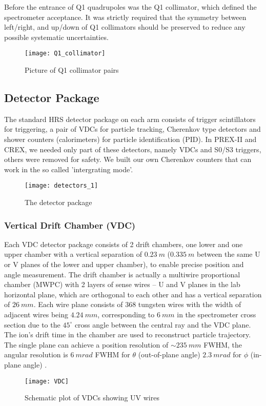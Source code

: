 Before the entrance of Q1 quadrupoles was the Q1 collimator, which defined
the spectrometer acceptance. It was strictly required that the symmetry between
left/right, and up/down of Q1 collimators should be preserved to reduce any
possible systematic uncertainties.
\begin{figure}[h!]
    \centering
    \texttt{[image: Q1\_collimator]}
    \caption{Picture of Q1 collimator pairs}
\end{figure}
\subsection{Detector Package}
The standard HRS detector package on each arm consists of trigger scintillators for
triggering, a pair of VDCs for particle tracking, Cherenkov type detectors and
shower counters (calorimeters) for particle identification (PID). In PREX-II
and CREX, we needed only part of these detectors, namely VDCs and S0/S3 triggers,
others were removed for safety. We built our own Cherenkov counters that can 
work in the so called 'intergrating mode'.
\begin{figure}[h!]
    \centering
    \texttt{[image: detectors\_1]}
    \caption{The detector package}
    \label{fig:detectors}
\end{figure}

\subsubsection{Vertical Drift Chamber (VDC)}
Each VDC detector package consists of 2 drift chambers, one lower and one upper
chamber with a vertical separation of $0.23\ m$ ($0.335\ m$ between the same
U or V planes of the lower and upper chamber), to enable precise position and angle measurement. 
The drift chamber is actually a multiwire proportional chamber (MWPC) with 2 
layers of sense wires -- U and V planes in the lab horizontal plane, which are 
orthogonal to each other and has a vertical separation of $26\ mm$. 
Each wire plane consists of 368 tungsten wires with the width of adjacent wires 
being $4.24\ mm$, corresponding to $6\ mm$ in the spectrometer cross section due to the $45^\circ$
cross angle between the central ray and the VDC plane. The ion's drift time in 
the chamber are used to reconstruct particle trajectory. The single plane can
achieve a position resolution of $\sim 235\ mm$ FWHM, the angular resolution
is $6\ mrad$ FWHM for $\theta$ (out-of-plane angle) $2.3\ mrad$ for $\phi$ (in-plane
angle) \cite{FISSUM2001108}.
\begin{figure}[h!]
    \centering
    \texttt{[image: VDC]}
    \caption{Schematic plot of VDCs showing UV wires \cite{FISSUM2001108}}
\end{figure}

